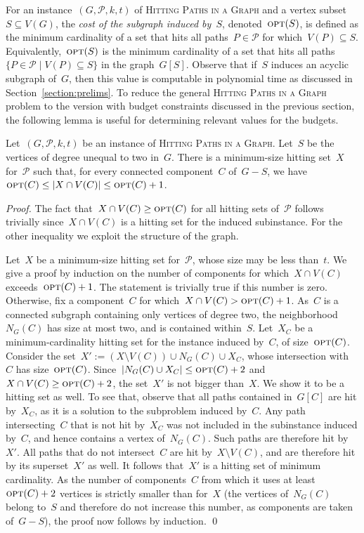 \let\accentvec\vec  \documentclass{llncs}
\renewcommand{\P}{\ensuremath{\mathcal{P}}\xspace}
\newcommand{\opt}{\ensuremath{\mathrm{\textsc{opt}}}\xspace}
\newcommand{\HitPathsInGraph}{\textsc{Hitting Paths in a Graph}\xspace}
\begin{document}
For an instance~$(G,\P,k,t)$ of \HitPathsInGraph and a vertex subset~$S \subseteq V(G)$, the \emph{cost of the subgraph induced by~$S$}, denoted~$\opt(S)$, is defined as the minimum cardinality of a set that hits all paths~$P \in \P$ for which~$V(P) \subseteq S$. Equivalently,~$\opt(S)$ is the minimum cardinality of a set that hits all paths~$\{ P \in \P \mid V(P) \subseteq S\}$ in the graph~$G[S]$. Observe that if~$S$ induces an acyclic subgraph of~$G$, then this value is computable in polynomial time as discussed in Section~\ref{section:prelims}. To reduce the general \HitPathsInGraph problem to the version with budget constraints discussed in the previous section, the following lemma is useful for determining relevant values for the budgets.

\begin{lemma} \label{lemma:budget:on:paths}
Let~$(G,\P,k,t)$ be an instance of \HitPathsInGraph. Let~$S$ be the vertices of degree unequal to two in~$G$. There is a minimum-size hitting set~$X$ for~$\P$ such that, for every connected component~$C$ of~$G - S$, we have~$\opt(C) \leq |X \cap V(C)| \leq \opt(C)+1$.
\end{lemma}
\begin{proof}
The fact that~$X \cap V(C) \geq \opt(C)$ for all hitting sets of~$\P$ follows trivially since~$X \cap V(C)$ is a hitting set for the induced subinstance. For the other inequality we exploit the structure of the graph.

Let~$X$ be a minimum-size hitting set for~$\P$, whose size may be less than~$t$. We give a proof by induction on the number of components for which~$X \cap V(C)$ exceeds~$\opt(C) + 1$. The statement is trivially true if this number is zero. Otherwise, fix a component~$C$ for which~$X \cap V(C) > \opt(C) + 1$. As~$C$ is a connected subgraph containing only vertices of degree two, the neighborhood~$N_G(C)$ has size at most two, and is contained within~$S$. Let~$X_C$ be a minimum-cardinality hitting set for the instance induced by~$C$, of size~$\opt(C)$. Consider the set~$X' := (X \setminus V(C)) \cup N_G(C) \cup X_C$, whose intersection with~$C$ has size~$\opt(C)$. Since~$|N_G(C) \cup X_C| \leq \opt(C) + 2$ and~$X \cap V(C) \geq \opt(C) + 2$, the set~$X'$ is not bigger than~$X$. We show it to be a hitting set as well. To see that, observe that all paths contained in~$G[C]$ are hit by~$X_C$, as it is a solution to the subproblem induced by~$C$. Any path intersecting~$C$ that is not hit by~$X_C$ was not included in the subinstance induced by~$C$, and hence contains a vertex of~$N_G(C)$. Such paths are therefore hit by~$X'$. All paths that do not intersect~$C$ are hit by~$X \setminus V(C)$, and are therefore hit by its superset~$X'$ as well. It follows that~$X'$ is a hitting set of minimum cardinality. As the number of components~$C$ from which it uses at least~$\opt(C) + 2$ vertices is strictly smaller than for~$X$ (the vertices of~$N_G(C)$ belong to~$S$ and therefore do not increase this number, as components are taken of~$G-S$), the proof now follows by induction.
\qed
\end{proof}
\end{document}
